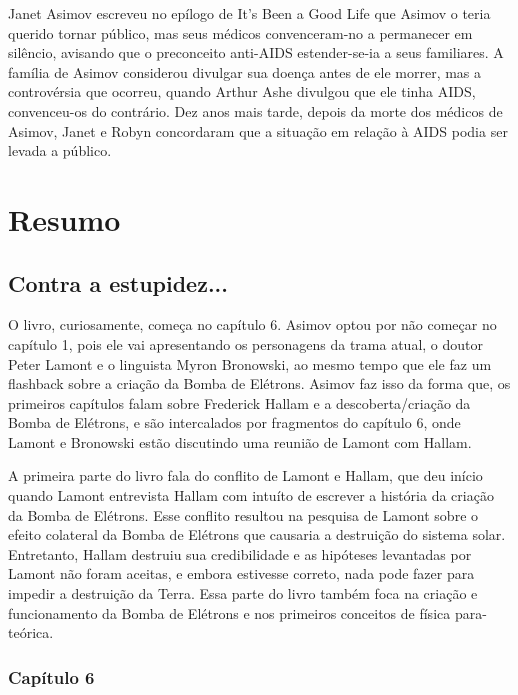 \documentclass[14pt,portuguese]{extreport}
\begin{document}
      Janet Asimov escreveu no epílogo de It's Been a Good Life que
      Asimov o teria querido tornar público, mas seus médicos
      convenceram-no a permanecer em silêncio, avisando que o
      preconceito anti-AIDS estender-se-ia a seus familiares. A família de
      Asimov considerou divulgar sua doença antes de ele morrer, mas a
      controvérsia que ocorreu, quando Arthur Ashe divulgou que ele
      tinha AIDS, convenceu-os do contrário. Dez anos mais tarde, depois
      da morte dos médicos de Asimov, Janet e Robyn concordaram que a
      situação em relação à AIDS podia ser levada a público.
      
  \chapter{Resumo}

    \section{Contra a estupidez...}
    
    	O livro, curiosamente, começa no capítulo 6. Asimov optou por não começar no capítulo 1, pois ele vai apresentando os personagens da trama atual, o doutor Peter Lamont e o linguista Myron Bronowski, 
    	ao mesmo tempo que ele faz um flashback sobre a criação da Bomba de Elétrons. Asimov faz isso da forma que, os primeiros capítulos falam sobre Frederick 
    	Hallam e a descoberta/criação da Bomba de Elétrons, e são intercalados por fragmentos do capítulo 6, onde Lamont e Bronowski estão discutindo uma reunião de Lamont com Hallam.
    	
    	A primeira parte do livro fala do conflito de Lamont e Hallam, que deu início quando Lamont entrevista Hallam com intuíto de escrever a história da criação da Bomba de Elétrons. 
    	Esse conflito resultou na pesquisa de Lamont sobre o efeito colateral da Bomba de Elétrons que causaria a destruição do sistema solar. 
    	Entretanto, Hallam destruiu sua credibilidade e as hipóteses levantadas por Lamont não foram aceitas, e embora estivesse correto, nada pode fazer para impedir a destruição da Terra. 
    	Essa parte do livro também foca na criação e funcionamento da Bomba de Elétrons e nos primeiros conceitos de física para-teórica.

    	\subsection {Capítulo 6}
\end{document}
